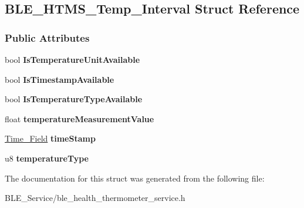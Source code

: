 \hypertarget{struct_b_l_e___h_t_m_s___temp___interval}{}\subsection{B\+L\+E\+\_\+\+H\+T\+M\+S\+\_\+\+Temp\+\_\+\+Interval Struct Reference}
\label{struct_b_l_e___h_t_m_s___temp___interval}
\subsubsection*{Public Attributes}
\begin{DoxyCompactItemize}
\item 
bool {\bfseries Is\+Temperature\+Unit\+Available}\hypertarget{struct_b_l_e___h_t_m_s___temp___interval_ac2e96086fb6a0434503d87e0b5922aa0}{}\label{struct_b_l_e___h_t_m_s___temp___interval_ac2e96086fb6a0434503d87e0b5922aa0}

\item 
bool {\bfseries Is\+Timestamp\+Available}\hypertarget{struct_b_l_e___h_t_m_s___temp___interval_aa76dcb45d2bb89443200fd21440914ff}{}\label{struct_b_l_e___h_t_m_s___temp___interval_aa76dcb45d2bb89443200fd21440914ff}

\item 
bool {\bfseries Is\+Temperature\+Type\+Available}\hypertarget{struct_b_l_e___h_t_m_s___temp___interval_a05eaff4970fd8a7ba9a7f89269b1c71a}{}\label{struct_b_l_e___h_t_m_s___temp___interval_a05eaff4970fd8a7ba9a7f89269b1c71a}

\item 
float {\bfseries temperature\+Measurement\+Value}\hypertarget{struct_b_l_e___h_t_m_s___temp___interval_a0974f106bbc3583e874d495a44a53552}{}\label{struct_b_l_e___h_t_m_s___temp___interval_a0974f106bbc3583e874d495a44a53552}

\item 
\hyperlink{struct_time___field}{Time\+\_\+\+Field} {\bfseries time\+Stamp}\hypertarget{struct_b_l_e___h_t_m_s___temp___interval_a7ba4f2cd813d33d8ca9b4f5aee7b3d49}{}\label{struct_b_l_e___h_t_m_s___temp___interval_a7ba4f2cd813d33d8ca9b4f5aee7b3d49}

\item 
u8 {\bfseries temperature\+Type}\hypertarget{struct_b_l_e___h_t_m_s___temp___interval_a7b6e6544a68f699ad6b72c74cba95e24}{}\label{struct_b_l_e___h_t_m_s___temp___interval_a7b6e6544a68f699ad6b72c74cba95e24}

\end{DoxyCompactItemize}


The documentation for this struct was generated from the following file\+:\begin{DoxyCompactItemize}
\item 
B\+L\+E\+\_\+\+Service/ble\+\_\+health\+\_\+thermometer\+\_\+service.\+h\end{DoxyCompactItemize}
